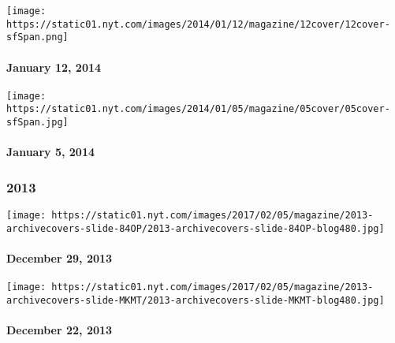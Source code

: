 \href{http://www.nytimes.com/indexes/2014/01/12/magazine/index.html}{}

\texttt{[image: https://static01.nyt.com/images/2014/01/12/magazine/12cover/12cover-sfSpan.png]}

\hypertarget{january-12-2014}{%
\paragraph{January 12, 2014}\label{january-12-2014}}

\href{http://www.nytimes.com/indexes/2014/01/06/magazine/index.html}{}

\texttt{[image: https://static01.nyt.com/images/2014/01/05/magazine/05cover/05cover-sfSpan.jpg]}

\hypertarget{january-5-2014}{%
\paragraph{January 5, 2014}\label{january-5-2014}}

\hypertarget{2013}{%
\subsubsection{2013}\label{2013}}

\href{http://www.nytimes.com/indexes/2013/12/29/magazine/index.html}{}

\texttt{[image: https://static01.nyt.com/images/2017/02/05/magazine/2013-archivecovers-slide-84OP/2013-archivecovers-slide-84OP-blog480.jpg]}

\hypertarget{december-29-2013}{%
\paragraph{December 29, 2013}\label{december-29-2013}}

\href{http://www.nytimes.com/indexes/2013/12/22/magazine/index.html}{}

\texttt{[image: https://static01.nyt.com/images/2017/02/05/magazine/2013-archivecovers-slide-MKMT/2013-archivecovers-slide-MKMT-blog480.jpg]}

\hypertarget{december-22-2013}{%
\paragraph{December 22, 2013}\label{december-22-2013}}

\href{http://www.nytimes.com/indexes/2013/12/15/magazine/index.html}{}

